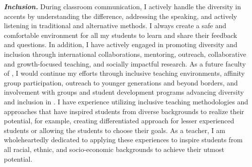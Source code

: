 \documentclass[9pt]{article}
\renewcommand*\paragraph[1]{}
\begin{document}
\paragraph{P4) The ability to contribute through teaching and/or service to the diversity, cultural sensitivity, and excellence of the academic community.}
\textit{\textbf{Inclusion.}}
During classroom communication, I actively handle the diversity in accents by understanding the difference, addressing the speaking, and actively listening in traditional and alternative methods.
I always create a safe and comfortable environment for all my students to learn and share their feedback and questions. In addition, I have actively engaged in promoting diversity and inclusion through international collaborations, mentoring, outreach, collaborative and growth-focused teaching, and socially impactful research. As a future faculty of \shortInstitutionName{}, I would continue my efforts through inclusive teaching environments, affinity group participation, outreach to younger generations and beyond borders, and involvement with groups and student development programs advancing diversity and inclusion in \shortInstitutionName{}.
I have experience utilizing inclusive teaching methodologies and approaches that have inspired students from diverse backgrounds to realize their potential, 
for example, creating differentiated approach for lesser experienced students or allowing the students to choose their goals.
As a teacher, I am wholeheartedly dedicated to applying these experiences to inspire students from all racial, ethnic, and socio-economic backgrounds to achieve their utmost potential.
\end{document}
